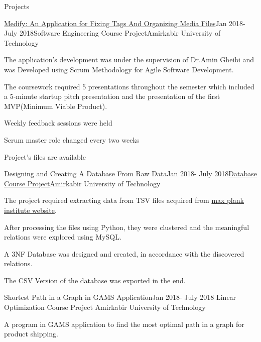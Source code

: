\documentclass{resume} %
\begin{document}

\begin{rSection}{Projects}
	
	\begin{rSubsection}{\href{https://github.com/pouyaaghahoseini/Medify}{Medify: An Application for Fixing Tags And Organizing Media Files}}{Jan 2018- July 2018}{Software Engineering Course Project}{Amirkabir University of Technology}

		\item The application's development was under the supervision of Dr.Amin Gheibi and was Developed using Scrum Methodology for Agile Software Development.
		\item The coursework required 5 presentations throughout the semester which included a 5-minute startup pitch presentation and the presentation of the first MVP(Minimum Viable Product).
		\item Weekly feedback sessions were held
		\item Scrum master role changed every two weeks
		\item Project's files are available 		
	\end{rSubsection}

\begin{rSubsection}{Designing and Creating A Database From Raw Data}{Jan 2018- July 2018}{\href{https://github.com/pouyaaghahoseini/Database-Course}{Database Course Project}}{Amirkabir University of Technology}
	\item The project required extracting data from TSV files acquired from \href{https://www.mpi-inf.mpg.de/departments/databases-and-information-systems/research/yago-naga/yago/downloads/}{max plank institute website}.
	\item After processing the files using Python, they were clustered and the meaningful relations were explored using MySQL.
	\item A 3NF Database was designed and created, in accordance with the discovered relations.
	\item The CSV Version of the database was exported in the end. 
	
\end{rSubsection}	

	
\begin{rSubsection}{Shortest Path in a Graph in GAMS Application}{Jan 2018- July 2018}{
Linear Optimization Course Project }{Amirkabir University of Technology}
	\item A program in GAMS application to find the most optimal path in a graph for product shipping.


\end{rSubsection}
\end{rSection}
\end{document}
